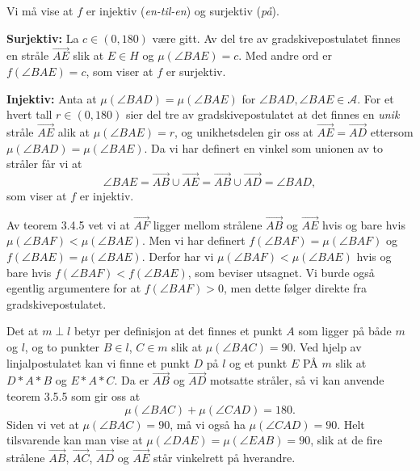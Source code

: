 \begin{oppgave}[3.4.2]
    \begin{punkt}
        Vi må vise at $f$ er injektiv (\emph{en-til-en}) og surjektiv (\emph{på}). 
        
        \textbf{Surjektiv:} La $c\in (0, 180)$ være gitt. Av del tre av gradskivepostulatet finnes en 
        stråle $\overrightarrow{AE}$ slik at $E\in H$ og $\mu(\angle BAE) = c$. Med andre ord er 
        $f(\angle BAE)=c$, som viser at $f$ er surjektiv. 

        \textbf{Injektiv:} Anta at $\mu(\angle BAD) = \mu(\angle BAE)$ for 
        $\angle BAD, \angle BAE \in \mathcal{A}$. For et hvert tall $r\in (0, 180)$ sier del tre av 
        gradskivepostulatet at det finnes en \emph{unik} stråle $\overrightarrow{AE}$ alik at 
        $\mu(\angle BAE)=r$, og unikhetsdelen gir oss at $\overrightarrow{AE}=\overrightarrow{AD}$ 
        ettersom $\mu(\angle BAD) = \mu(\angle BAE)$. Da vi har definert en vinkel som unionen av to stråler
        får vi at 
        $$ \angle BAE 
        = \overrightarrow{AB}\cup \overrightarrow{AE}
        = \overrightarrow{AB}\cup \overrightarrow{AD} 
        = \angle BAD, $$
        som viser at $f$ er injektiv. 
    \end{punkt}

    \begin{punkt}
        Av teorem 3.4.5 vet vi at $\overrightarrow{AF}$ ligger mellom strålene $\overrightarrow{AB}$ og 
        $\overrightarrow{AE}$ hvis og bare hvis $\mu(\angle BAF)<\mu(\angle BAE)$. Men vi har definert 
        $f(\angle BAF)=\mu(\angle BAF)$ og $f(\angle BAE)=\mu(\angle BAE)$. Derfor har vi 
        $\mu(\angle BAF)<\mu(\angle BAE)$ hvis og bare hvis $f(\angle BAF)<f(\angle BAE)$, 
        som beviser utsagnet. Vi burde også egentlig argumentere for at $f(\angle BAF)>0$, men dette 
        følger direkte fra gradskivepostulatet. 
    \end{punkt}
\end{oppgave}

\begin{oppgave}[3.5.1]
    Det at $m\perp l$ betyr per definisjon at det finnes et punkt $A$ som ligger på både $m$ og $l$, og 
    to punkter $B\in l$, $C\in m$ slik at $\mu(\angle BAC) = 90$. Ved hjelp av linjalpostulatet kan vi 
    finne et punkt $D$ på $l$ og et punkt $E$ PÅ $m$ slik at $D\ast A\ast B$ og $E\ast A\ast C$. Da er 
    $\overrightarrow{AB}$ og $\overrightarrow{AD}$ motsatte stråler, så vi kan anvende teorem 3.5.5 som 
    gir oss at 
    $$ \mu(\angle BAC)+\mu(\angle CAD) = 180 .$$
    Siden vi vet at $\mu(\angle BAC)=90$, må vi også ha $\mu(\angle CAD)=90$. Helt tilsvarende kan man 
    vise at $\mu(\angle DAE)=\mu(\angle EAB) = 90$, slik at de fire strålene $\overrightarrow{AB}$, 
    $\overrightarrow{AC}$, $\overrightarrow{AD}$ og $\overrightarrow{AE}$ står vinkelrett på hverandre. 
\end{oppgave}

